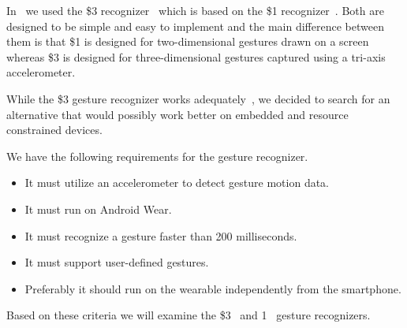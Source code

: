 In~\cite{prespecialisation} we used the \$3 recognizer~\cite{threedollar} which is based on the \$1 recognizer~\cite{wobbrock2007gestures}.
Both are designed to be simple and easy to implement and the main difference between them is that \$1 is designed for two-dimensional gestures drawn on a screen whereas \$3 is designed for three-dimensional gestures captured using a tri-axis accelerometer.

While the \$3 gesture recognizer works adequately~\cite[p. 55]{prespecialisation}, we decided to search for an alternative that would possibly work better on embedded and resource constrained devices.

We have the following requirements for the gesture recognizer.

\begin{itemize}
    \item It must utilize an accelerometer to detect gesture motion data.
    \item It must run on Android Wear.
    \item It must recognize a gesture faster than 200 milliseconds.
    \item It must support user-defined gestures.
    \item Preferably it should run on the wearable independently from the smartphone.
\end{itemize}

\noindent Based on these criteria we will examine the \$3~\cite{threedollar} and 1\textcent~\cite{herold20121} gesture recognizers.





